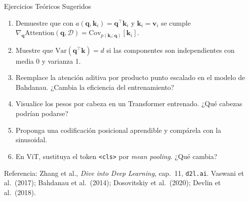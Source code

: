 \documentclass[aspectratio=169, 10pt]{beamer}
\newcommand{\qv}{\mathbf{q}}
\newcommand{\kv}{\mathbf{k}}
\newcommand{\vv}{\mathbf{v}}
\begin{document}
\begin{frame}{Ejercicios Te\'oricos Sugeridos}
	\begin{enumerate}
		\item Demuestre que con $a(\qv,\kv_i)=\qv^\top\kv_i$ y $\kv_i=\vv_i$ se cumple $\nabla_{\qv}\mathrm{Attention}(\qv,\mathcal{D})=\mathrm{Cov}_{p(\kv_i;\qv)}[\kv_i]$.
		\item Muestre que $\mathrm{Var}(\qv^\top\kv)=d$ si las componentes son independientes con media 0 y varianza 1.
		\item Reemplace la atenci\'on aditiva por producto punto escalado en el modelo de Bahdanau. ¿Cambia la eficiencia del entrenamiento?
		\item Visualice los pesos por cabeza en un Transformer entrenado. ¿Qu\'e cabezas podr\'ian podarse?
		\item Proponga una codificaci\'on posicional aprendible y comp\'arela con la sinusoidal.
		\item En ViT, sustituya el token \texttt{<cls>} por \emph{mean pooling}. ¿Qu\'e cambia?
	\end{enumerate}
	\vfill
	{\scriptsize Referencia: Zhang et al., \emph{Dive into Deep Learning}, cap.\ 11, \texttt{d2l.ai}. Vaswani et al.\ (2017); Bahdanau et al.\ (2014); Dosovitskiy et al.\ (2020); Devlin et al.\ (2018).}
\end{frame}
\end{document}
